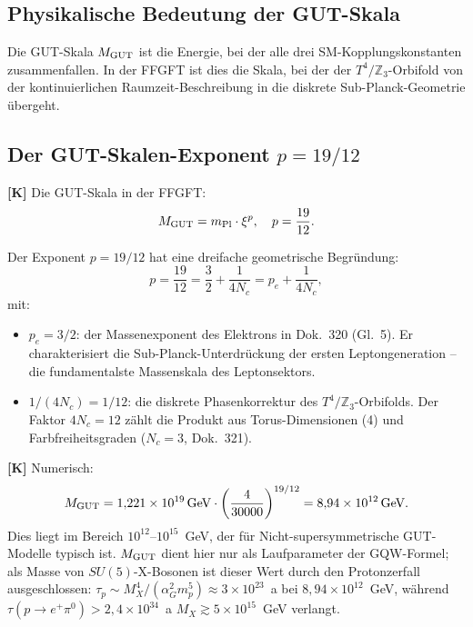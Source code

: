 \subsection{Physikalische Bedeutung der GUT-Skala}

Die GUT-Skala $M_{\rm GUT}$ ist die Energie, bei der alle drei
SM-Kopplungskonstanten zusammenfallen. In der FFGFT ist dies die
Skala, bei der der $T^4/\mathbb{Z}_3$-Orbifold von der
kontinuierlichen Raumzeit-Beschreibung in die diskrete
Sub-Planck-Geometrie übergeht.

\subsection{Der GUT-Skalen-Exponent $p = 19/12$}

\textbf{[K]} Die GUT-Skala in der FFGFT:
\begin{equation}
  M_{\rm GUT} = m_{\rm Pl}\cdot\xi^{p},
  \quad p = \frac{19}{12}.
  \label{eq:MGUT}
\end{equation}

Der Exponent $p = 19/12$ hat eine dreifache geometrische Begründung:
\begin{equation}
  p = \frac{19}{12} = \frac{3}{2} + \frac{1}{4N_c}
    = p_e + \frac{1}{4N_c},
  \label{eq:p_decomp}
\end{equation}
mit:
\begin{itemize}
  \item $p_e = 3/2$: der Massenexponent des Elektrons in Dok.~320
    (Gl.~5). Er charakterisiert die Sub-Planck-Unterdrückung der
    ersten Leptongeneration -- die fundamentalste Massenskala des
    Leptonsektors.
  \item $1/(4N_c) = 1/12$: die diskrete Phasenkorrektur des
    $T^4/\mathbb{Z}_3$-Orbifolds. Der Faktor $4N_c = 12$ zählt die
    Produkt aus Torus-Dimensionen (4) und Farbfreiheitsgraden
    ($N_c = 3$, Dok.~321).
\end{itemize}

\textbf{[K]} Numerisch:
\begin{equation}
  M_{\rm GUT} = 1{,}221\times10^{19}\,\text{GeV}
  \cdot\left(\frac{4}{30000}\right)^{19/12}
  = 8{,}94\times10^{12}\,\text{GeV}.
  \label{eq:MGUT_num}
\end{equation}
Dies liegt im Bereich $10^{12}$--$10^{15}$~GeV, der für Nicht-supersymmetrische
GUT-Modelle typisch ist.
$M_{\rm GUT}$ dient hier nur als Laufparameter der GQW-Formel; als Masse
von $SU(5)$-X-Bosonen ist dieser Wert durch den Protonzerfall ausgeschlossen:
$\tau_p \sim M_X^4/(\alpha_G^2 m_p^5) \approx 3\times10^{23}$~a bei
$8{,}94\times10^{12}$~GeV, während $\tau(p\to e^+\pi^0) > 2{,}4\times10^{34}$~a
$M_X \gtrsim 5\times10^{15}$~GeV verlangt.

